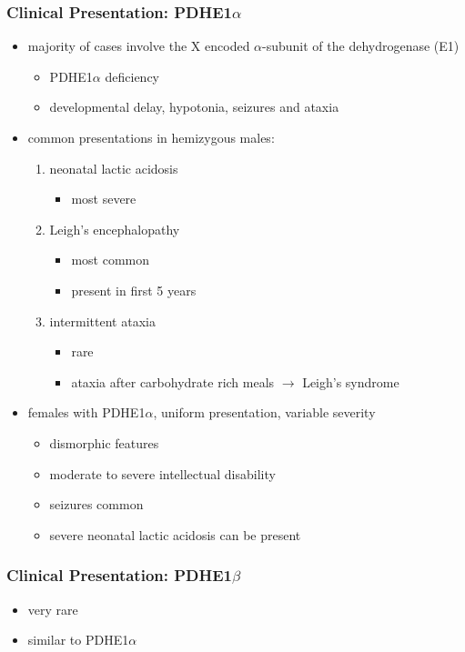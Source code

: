 \documentclass[12pt]{scrartcl}
\begin{document}
\subsubsection{Clinical Presentation: PDHE1\(\alpha\)}
\label{sec:orgaf5353f}
\begin{itemize}
\item majority of cases involve the X encoded \(\alpha\)-subunit of the dehydrogenase (E1)
\begin{itemize}
\item PDHE1\(\alpha\) deficiency
\item developmental delay, hypotonia, seizures and ataxia
\end{itemize}

\item common presentations in hemizygous males:
\begin{enumerate}
\item neonatal lactic acidosis
\begin{itemize}
\item most severe
\end{itemize}
\item Leigh's encephalopathy
\begin{itemize}
\item most common
\item present in first 5 years
\end{itemize}
\item intermittent ataxia
\begin{itemize}
\item rare
\item ataxia after carbohydrate rich meals \(\to\) Leigh's syndrome
\end{itemize}
\end{enumerate}

\item females with PDHE1\(\alpha\), uniform presentation, variable severity
\begin{itemize}
\item dismorphic features
\item moderate to severe intellectual disability
\item seizures common
\item severe neonatal lactic acidosis can be present
\end{itemize}
\end{itemize}

\subsubsection{Clinical Presentation: PDHE1\(\beta\)}
\label{sec:orgabdb770}
\begin{itemize}
\item very rare
\item similar to PDHE1\(\alpha\)
\end{itemize}
\end{document}
